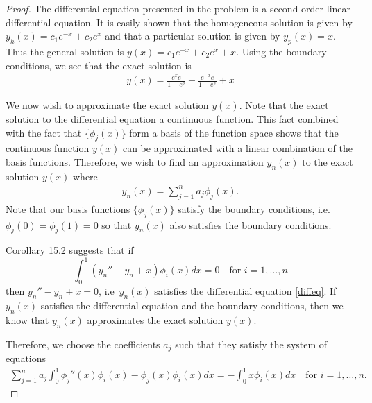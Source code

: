 \begin{proof}
  The differential equation presented in the problem is a second order linear
  differential equation. It is easily shown that the homogeneous solution is
  given by $y_h(x) = c_1 e^{-x} + c_2e^{x}$ and that a particular solution is
  given by $y_p(x) = x$. Thus the general solution is $y(x) = c_1 e^{-x} + c_2e^{x} + x$.
  Using the boundary conditions, we see that the exact solution is
  \begin{align}\label{exact}
    y(x) = \frac{e^{x}e}{1-e^2} -\frac{e^{-x}e}{1-e^2} + x
  \end{align}

  We now wish to approximate the exact solution $y(x)$.
  Note that the exact solution to the differential equation %
  a continuous function. This fact combined with the fact that $\{\phi_j(x)\}$
  form a basis of the function space shows that the continuous function $y(x)$
  can be approximated with a linear combination of the basis functions.
  Therefore, we wish to find an approximation $y_n(x)$ to the exact solution
  $y(x)$ where
  \begin{align}\label{finite_approximation}
    y_n(x) = \sum_{j=1}^n a_j \phi_j(x).
  \end{align}
  Note that our basis functions $\{\phi_j(x)\}$ satisfy the boundary
  conditions, i.e.\ $\phi_j(0) = \phi_j(1) = 0$ so that $y_n(x)$ also satisfies the
  boundary conditions.

  Corollary 15.2 suggests that if
  \[
    \int_0^1 (y_n'' - y_n + x)\phi_i(x) dx = 0 \quad \text{for $i=1,\dots,n$}
  \]
  then $y_n'' - y_n + x = 0$, i.e\ $y_n(x)$ satisfies the differential
  equation \eqref{diffeq}. If $y_n(x)$ satisfies the
  differential equation and the boundary conditions, then we know that $y_n(x)$
  approximates the exact solution $y(x)$.

  Therefore, we choose the coefficients $a_j$ such that they satisfy the system of
  equations
  \begin{align}\label{first_system}
    \sum_{j=1}^n a_j \int_0^1 \phi_j''(x)\phi_i(x) - \phi_j(x)\phi_i(x) dx = -\int_0^1 x \phi_i(x) dx \quad \text{for $i=1,\dots,n$}.
  \end{align}


\end{proof}
